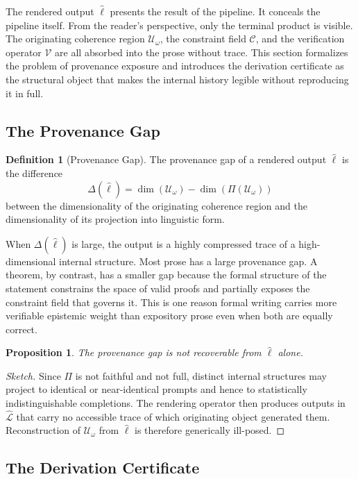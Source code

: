 \documentclass[12pt, a4paper]{article}
\theoremstyle{plain}
\newtheorem{proposition}[theorem]{Proposition}
\theoremstyle{definition}
\newtheorem{definition}[theorem]{Definition}
\theoremstyle{remark}
\begin{document}
The rendered output $\hat{\ell}$ presents the result of the pipeline. It conceals the pipeline itself. From the reader's perspective, only the terminal product is visible. The originating coherence region $\mathcal{U}_\omega$, the constraint field $\mathcal{C}$, and the verification operator $\mathcal{V}$ are all absorbed into the prose without trace. This section formalizes the problem of provenance exposure and introduces the derivation certificate as the structural object that makes the internal history legible without reproducing it in full.

\subsection{The Provenance Gap}

\begin{definition}[Provenance Gap]
The provenance gap of a rendered output $\hat{\ell}$ is the difference
\[
\Delta(\hat{\ell}) = \dim(\mathcal{U}_\omega) - \dim(\Pi(\mathcal{U}_\omega))
\]
between the dimensionality of the originating coherence region and the dimensionality of its projection into linguistic form.
\end{definition}

When $\Delta(\hat{\ell})$ is large, the output is a highly compressed trace of a high-dimensional internal structure. Most prose has a large provenance gap. A theorem, by contrast, has a smaller gap because the formal structure of the statement constrains the space of valid proofs and partially exposes the constraint field that governs it. This is one reason formal writing carries more verifiable epistemic weight than expository prose even when both are equally correct.

\begin{proposition}
The provenance gap is not recoverable from $\hat{\ell}$ alone.
\end{proposition}

\begin{proof}[Sketch]
Since $\Pi$ is not faithful and not full, distinct internal structures may project to identical or near-identical prompts and hence to statistically indistinguishable completions. The rendering operator then produces outputs in $\widehat{\mathcal{L}}$ that carry no accessible trace of which originating object generated them. Reconstruction of $\mathcal{U}_\omega$ from $\hat{\ell}$ is therefore generically ill-posed.
\end{proof}

\subsection{The Derivation Certificate}
\end{document}
